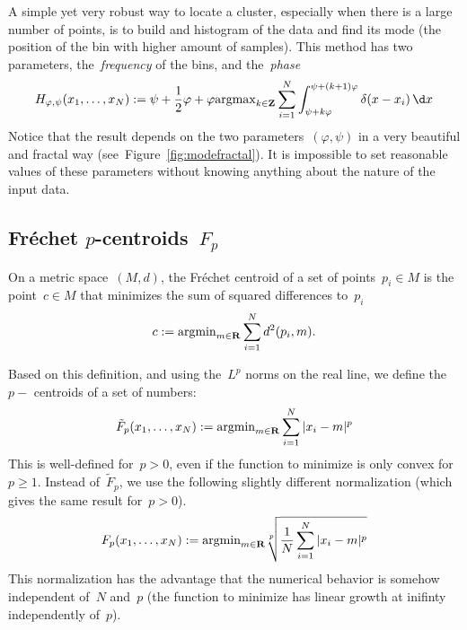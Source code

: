 A simple yet very robust way to locate a cluster, especially when
there is a large number of points, is to build and histogram of the
data and find its mode (the position of the bin with higher amount of
samples).  This method has two parameters, the~\emph{frequency} of the bins,
and the~\emph{phase}
\[
	H_{\varphi,\psi}(x_1,\ldots,x_N) :=
	\psi+\frac{1}{2}\varphi+\varphi\mathrm{argmax}_{k\in\Z}
	\sum_{i=1}^N\int_{\psi+k\varphi}^{\psi+(k+1)\varphi}
	\delta(x-x_i)\,\d x
\]
Notice
that the result depends on the two parameters~$(\varphi,\psi)$ in a
very beautiful and fractal way (see~Figure~\ref{fig:modefractal}).
It is impossible to set reasonable values of these parameters without
knowing anything about the nature of the input data.


\subsection{Fréchet $p$-centroids~$F_p$}

On a metric space~$(M,d)$, the Fréchet centroid of a set of
points~$p_i\in M$ is the point~$c\in M$ that minimizes the sum of
squared differences to~$p_i$
\[
	c := \mathrm{argmin}_{m\in\mathbf{R}}\sum_{i=1}^N d^2(p_i,m).
\]

Based on this definition, and using the~$L^p$ norms on the real line,
we define the~$p-$ centroids of a set of numbers:
\[
	\tilde F_p(x_1,\ldots,x_N) := \mathrm{argmin}_{m\in\mathbf{R}}\sum_{i=1}^N|x_i-m|^p
\]
This is well-defined for~$p>0$, even if the function to minimize is
only convex for~$p\ge1$.  Instead of~$\tilde F_p$, we use the
following slightly different normalization (which gives the same result for~$p>0$).
\[
	F_p(x_1,\ldots,x_N) :=
	\mathrm{argmin}_{m\in\mathbf{R}}\sqrt[p]{\frac{1}{N}\sum_{i=1}^N|x_i-m|^p}
\]
This normalization has the advantage that the numerical behavior is
somehow independent of~$N$ and~$p$  (the function to minimize has
linear growth at inifinty independently of~$p$).

